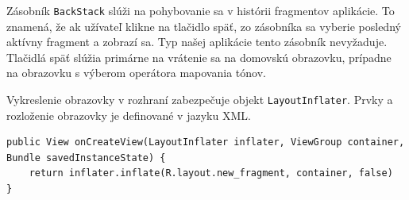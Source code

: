 Zásobník \texttt{BackStack} slúži na pohybovanie sa v histórii fragmentov aplikácie. To znamená, že ak užívateľ klikne
na tlačidlo späť, zo zásobníka sa vyberie posledný aktívny fragment a zobrazí sa. Typ našej aplikácie tento zásobník
nevyžaduje. Tlačidlá späť slúžia primárne na vrátenie sa na domovskú obrazovku, prípadne na obrazovku s výberom
operátora mapovania tónov.

Vykreslenie obrazovky v rozhraní zabezpečuje objekt \texttt{LayoutInflater}. Prvky a rozloženie obrazovky
je definované v jazyku XML.
\begin{lstlisting}[morekeywords={View, LayoutInflater, ViewGroup, Bundle}]
public View onCreateView(LayoutInflater inflater, ViewGroup container, Bundle savedInstanceState) {
    return inflater.inflate(R.layout.new_fragment, container, false)
}                                  
\end{lstlisting}

